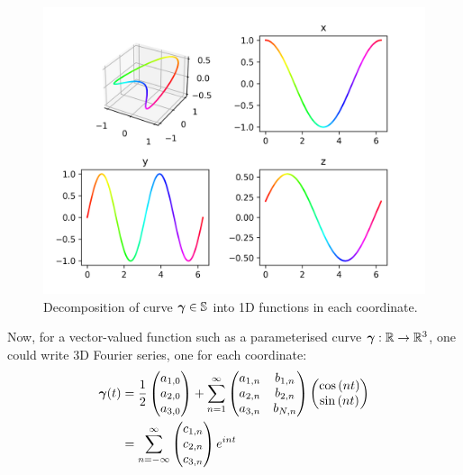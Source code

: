 \documentclass[../dissertation.tex]{subfiles}
\begin{document}
\begin{figure}[tbp]
    \centering
    \includegraphics[width=\textwidth]{sections/FourierSeriesImgs/FSProjection}
    \caption{Decomposition of curve $\boldsymbol{\gamma}\in\mathbb{S}$ into 1D functions in each coordinate.}
\end{figure}
Now, for a vector-valued function such as a parameterised curve $\boldsymbol{\gamma}:\mathbb{R} \rightarrow \mathbb{R}^3$, one could write 3D Fourier series,
one for each coordinate:
\begin{align}
    \mathbf{\boldsymbol{\gamma}} (t) &= \frac{1}{2}
    \begin{pmatrix}
        a_{1,0} \\
        a_{2,0} \\
        a_{3,0}
    \end{pmatrix}
    + \sum_{n=1}^\infty
    \begin{pmatrix}
        a_{1,n} & b_{1,n} \\
        a_{2,n} & b_{2,n} \\
        a_{3,n} & b_{N,n}
    \end{pmatrix}
    \begin{pmatrix}
        \cos {\left( nt \right)} \\
        \sin {\left( nt \right)}
    \end{pmatrix}
    \\
    &= \sum_{n=-\infty}^{\infty}
    \begin{pmatrix}
        c_{1,n} \\
        c_{2,n} \\
        c_{3,n}
    \end{pmatrix}
    e^{int}
\end{align}
\end{document}
